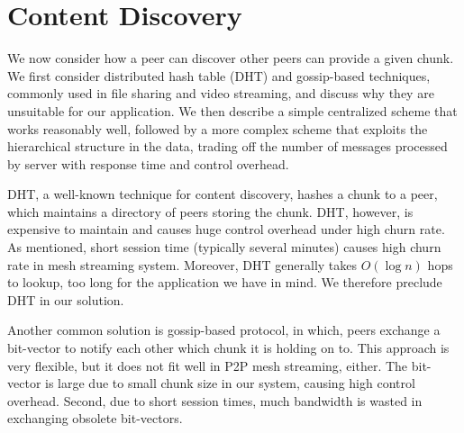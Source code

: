 
\section{Content Discovery}
\label{s:content}

    We now consider how a peer can discover other peers can provide a given chunk.
    We first consider distributed
    hash table (DHT) and gossip-based techniques, 
    commonly used in file sharing and video streaming, and
    discuss why they are unsuitable for our application.  We then
    describe a simple centralized scheme that works reasonably well,
    followed by a more complex scheme that exploits the 
    hierarchical structure in the data, trading off
    the number of messages processed by server with response time and control overhead.

    DHT, a well-known technique for 
    content discovery,  hashes a chunk to a
    peer, which maintains a directory of peers storing the
    chunk.  DHT, however, is expensive to maintain and 
    causes huge control overhead under high churn 
    rate.  As mentioned, %
    short session time (typically several minutes)
    causes high churn rate in mesh streaming system.
    Moreover, DHT generally takes $O(\log{n})$ hops to lookup,
    too long for the application we have in mind.
    We therefore preclude DHT in our solution.

    Another common solution is gossip-based protocol, in which, peers
    exchange a bit-vector to notify each other which chunk it is
    holding on to. This approach is very flexible, but it does not fit
    well in P2P mesh streaming, either. The bit-vector is large
    due to small chunk size in our system, causing high
    control overhead. Second, due to short session times, much
    bandwidth is wasted in exchanging obsolete bit-vectors. 

